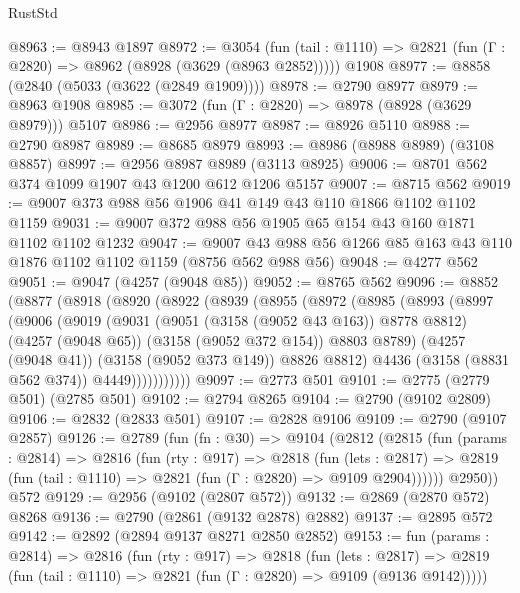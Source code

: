 \begin{lexlean}{RustStd}
\begin{coremodule}
@8963 := @8943 @1897
@8972 := @3054
    (fun (tail : @1110) => @2821 (fun (Γ : @2820) => @8962 (@8928 (@3629 (@8963 @2852)))))
    @1908
@8977 := @8858 (@2840 (@5033 (@3622 (@2849 @1909))))
@8978 := @2790 @8977
@8979 := @8963 @1908
@8985 := @3072 (fun (Γ : @2820) => @8978 (@8928 (@3629 @8979))) @5107
@8986 := @2956 @8977
@8987 := @8926 @5110
@8988 := @2790 @8987
@8989 := @8685 @8979
@8993 := @8986 (@8988 @8989) (@3108 @8857)
@8997 := @2956 @8987 @8989 (@3113 @8925)
@9006 := @8701 @562 @374 @1099 @1907 @43 @1200 @612 @1206 @5157
@9007 := @8715 @562
@9019 := @9007 @373 @988 @56 @1906 @41 @149 @43 @110 @1866 @1102 @1102 @1159
@9031 := @9007 @372 @988 @56 @1905 @65 @154 @43 @160 @1871 @1102 @1102 @1232
@9047 := @9007 @43 @988 @56 @1266 @85 @163 @43 @110 @1876 @1102 @1102 @1159 (@8756 @562 @988 @56)
@9048 := @4277 @562
@9051 := @9047 (@4257 (@9048 @85))
@9052 := @8765 @562
@9096 := @8852
    (@8877
      (@8918
        (@8920
          (@8922
            (@8939
              (@8955
                (@8972
                  (@8985
                    (@8993
                      (@8997
                        (@9006
                          (@9019
                            (@9031
                              (@9051 (@3158 (@9052 @43 @163)) @8778 @8812)
                              (@4257 (@9048 @65))
                              (@3158 (@9052 @372 @154))
                              @8803
                              @8789)
                            (@4257 (@9048 @41))
                            (@3158 (@9052 @373 @149))
                            @8826
                            @8812)
                          @4436
                          (@3158 (@8831 @562 @374))
                          @4449)))))))))))
@9097 := @2773 @501
@9101 := @2775 (@2779 @501) (@2785 @501)
@9102 := @2794 @8265
@9104 := @2790 (@9102 @2809)
@9106 := @2832 (@2833 @501)
@9107 := @2828 @9106
@9109 := @2790 (@9107 @2857)
@9126 := @2789
    (fun (fn : @30) =>
    @9104
      (@2812
        (@2815
          (fun (params : @2814) =>
          @2816
            (fun (rty : @917) =>
            @2818
              (fun (lets : @2817) =>
              @2819 (fun (tail : @1110) => @2821 (fun (Γ : @2820) => @9109 @2904))))))
        @2950))
    @572
@9129 := @2956 (@9102 (@2807 @572))
@9132 := @2869 (@2870 @572) @8268
@9136 := @2790 (@2861 (@9132 @2878) @2882)
@9137 := @2895 @572
@9142 := @2892 (@2894 @9137 @8271 @2850 @2852)
@9153 := fun (params : @2814) =>
  @2816
    (fun (rty : @917) =>
    @2818
      (fun (lets : @2817) =>
      @2819 (fun (tail : @1110) => @2821 (fun (Γ : @2820) => @9109 (@9136 @9142)))))

\end{coremodule}
\end{lexlean}

